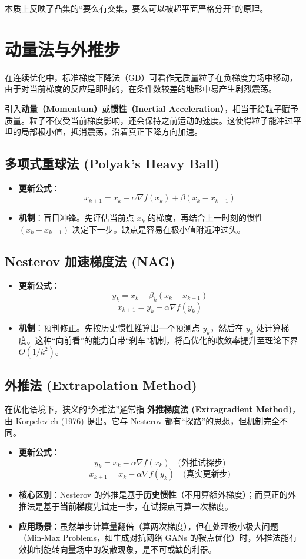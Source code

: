 本质上反映了凸集的“要么有交集，要么可以被超平面严格分开”的原理。

\section{动量法与外推步}
在连续优化中，标准梯度下降法（GD）可看作无质量粒子在负梯度力场中移动，由于对当前梯度的反应是即时的，在条件数较差的地形中易产生剧烈震荡。

引入\textbf{动量（Momentum）}或\textbf{惯性（Inertial Acceleration）}，相当于给粒子赋予质量。粒子不仅受当前梯度影响，还会保持之前运动的速度。这使得粒子能冲过平坦的局部极小值，抵消震荡，沿着真正下降方向加速。
\subsection{多项式重球法 (Polyak's Heavy Ball)}
\begin{itemize}
    \item \textbf{更新公式}：
    $$x_{k+1} = x_k - \alpha \nabla f(x_k) + \beta (x_k - x_{k-1})$$
    \item \textbf{机制}：盲目冲锋。先评估当前点 $x_k$ 的梯度，再结合上一时刻的惯性 $(x_k - x_{k-1})$ 决定下一步。缺点是容易在极小值附近冲过头。
\end{itemize}

\subsection{Nesterov 加速梯度法 (NAG)}
\begin{itemize}
    \item \textbf{更新公式}：
    $$y_k = x_k + \beta_k (x_k - x_{k-1})$$
    $$x_{k+1} = y_k - \alpha \nabla f(y_k)$$
    \item \textbf{机制}：预判修正。先按历史惯性推算出一个预测点 $y_k$，然后在 $y_k$ 处计算梯度。这种“向前看”的能力自带“刹车”机制，将凸优化的收敛率提升至理论下界 $O(1/k^2)$。
\end{itemize}

\subsection{外推法 (Extrapolation Method)}
在优化语境下，狭义的“外推法”通常指 \textbf{外推梯度法 (Extragradient Method)}，由 Korpelevich (1976) 提出。它与 Nesterov 都有“探路”的思想，但机制完全不同。

\begin{itemize}
    \item \textbf{更新公式}：
    $$y_k = x_k - \alpha \nabla f(x_k) \quad \text{(外推试探步)}$$
    $$x_{k+1} = x_k - \alpha \nabla f(y_k) \quad \text{(真实更新步)}$$
    \item \textbf{核心区别}：Nesterov 的外推是基于\textbf{历史惯性}（不用算额外梯度）；而真正的外推法是基于\textbf{当前梯度}先试走一步，在试探点再算一次梯度。
    \item \textbf{应用场景}：虽然单步计算量翻倍（算两次梯度），但在处理极小极大问题（Min-Max Problems，如生成对抗网络 GANs 的鞍点优化）时，外推法能有效抑制旋转向量场中的发散现象，是不可或缺的利器。
\end{itemize}

